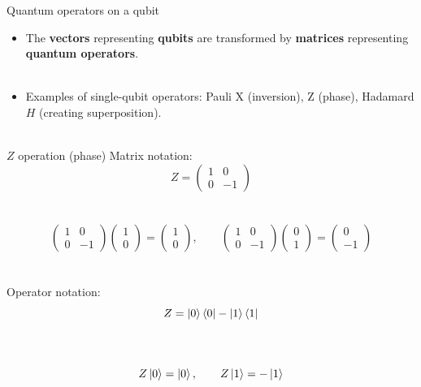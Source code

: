 \documentclass[aspectratio=169,12pt]{beamer}
\begin{document}
\begin{frame}{Quantum operators on a qubit}
  \begin{itemize}[<+->]
    \setlength{\itemsep}{0.55em}
    \item The \textbf{vectors} representing \textbf{qubits} are transformed by \textbf{matrices}
     representing \textbf{quantum operators}.\\~\\
    \item Examples of single-qubit operators: Pauli X (inversion), Z (phase), Hadamard $H$ (creating superposition).\\~\\
  \end{itemize}
\end{frame}

\begin{frame}{$Z$ operation (phase)}
  Matrix notation:
  $$
    Z = \begin{pmatrix}1 & 0 \\ 0 & -1\end{pmatrix}
  $$\\~\\
  $$
    \begin{pmatrix}1 & 0 \\ 0 & -1\end{pmatrix}
    \begin{pmatrix}1\\0\end{pmatrix}=
    \begin{pmatrix}1\\0\end{pmatrix},
    \qquad
    \begin{pmatrix}1 & 0 \\ 0 & -1\end{pmatrix}
    \begin{pmatrix}0\\1\end{pmatrix}=
    \begin{pmatrix}0\\-1\end{pmatrix}
  $$
  ~\\~\\
  Operator notation: $$Z = \ket 0 \bra 0 - \ket 1 \bra 1$$\\~\\
  $$
    Z\ket 0 = \ket 0, \qquad
    Z\ket 1 = -\ket 1
  $$
  
\end{frame}
\end{document}
